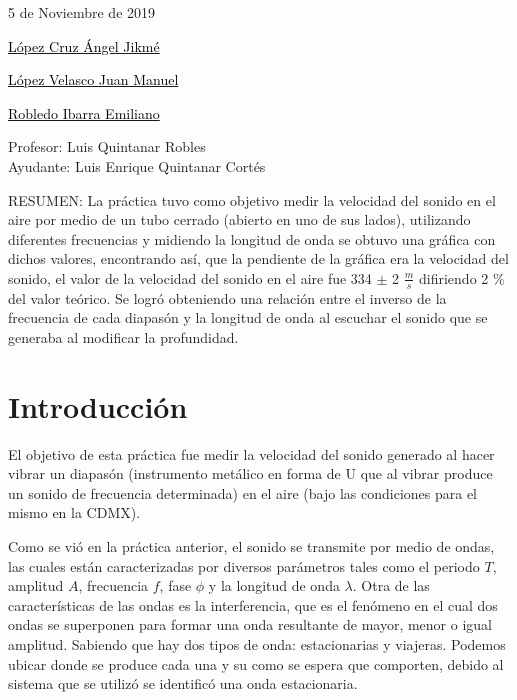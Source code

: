 \documentclass[10pt,a4paper]{article}
\begin{document}
\vspace{.7 cm}
\begin{flushleft}{\Large 5 de Noviembre de 2019  }\\[1 cm]
\end{flushleft}
\begin{flushright}{\Large{\underline{\textcolor{black}{López Cruz Ángel Jikmé}}}}\\[0.78cm]
\end{flushright}
\begin{flushright}{\Large{\underline{\textcolor{black}{López Velasco Juan Manuel}}}}\\[0.78cm]

\begin{flushright}{\Large{\underline{\textcolor{black}{Robledo Ibarra Emiliano}}}}\\[1 cm]
\end{flushright}\end{flushright}
\begin{center}
{\Large Profesor: Luis Quintanar Robles }\\[0.4cm]
{\Large Ayudante: Luis Enrique Quintanar Cortés }\\[1 cm]
\end{center}
RESUMEN:
La práctica tuvo como objetivo medir la velocidad del sonido en el aire por medio de un tubo cerrado (abierto en uno de sus lados), utilizando diferentes frecuencias y midiendo la longitud de onda se obtuvo una gráfica con dichos valores, encontrando así, que la pendiente de la gráfica era la velocidad del sonido, el valor de la velocidad del sonido en el aire fue 334 $\pm$ 2 $\frac{m}{s}$ difiriendo 2 $\%$ del valor teórico. Se logró obteniendo una relación entre el inverso de la frecuencia de cada diapasón y la longitud de onda al escuchar el sonido que se generaba al modificar la profundidad.
\normalsize
\newpage


\section{Introducción}

El objetivo de esta práctica fue medir la velocidad del sonido generado al hacer vibrar un diapasón (instrumento metálico en forma de U que al vibrar produce un sonido de frecuencia determinada) en el aire (bajo las condiciones para el mismo en la CDMX). 

Como se vió en la práctica anterior, el sonido se transmite por medio de ondas, las cuales están caracterizadas por diversos parámetros tales como el periodo $T$, amplitud $A$, frecuencia $f$, fase $\phi$ y la longitud de onda $\lambda$. Otra de las características de las ondas es la interferencia, que es el fenómeno en el cual dos ondas se superponen para formar una onda resultante de mayor, menor o igual amplitud. Sabiendo que hay dos tipos de onda: estacionarias y viajeras. Podemos ubicar donde se produce cada una y su como se espera que comporten, debido al sistema que se utilizó se identificó una onda estacionaria.
\end{document}
